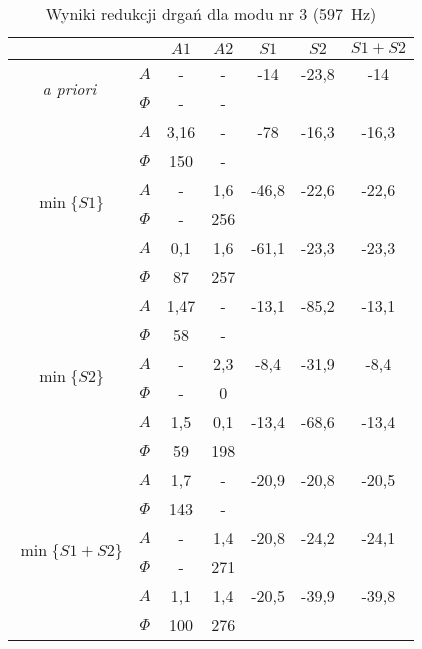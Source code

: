 \documentclass[polish,a4paper,11pt]{mwart}
\begin{document}
  \begin{table}[!tbh]
    \centering
    \caption{Wyniki redukcji drgań dla modu nr 3 (\SI{597}{\hertz})}
    \label{tab:red3}
    \begin{tabular}{|c|c|c|c|c|c|c|}
      \cline{3-7}
      \multicolumn{2}{c|}{}&$A1$&$A2$&$S1$&$S2$&$S1+S2$\\\hline
      \multirow{2}{*}{\textit{a priori}} & $A$ & - & - & -14 & -23,8 & -14\\\cline{2-7}
					 & $\Phi$ & - & - & \multicolumn{3}{c}{}\\\hline
      \multirow{6}{*}{$\min\{S1\}$}   &   $A$ & 3,16 & - & -78 & -16,3 & -16,3\\\cline{2-7}
				      &$\Phi$ & 150 & - & \multicolumn{3}{c}{}\\\cline{2-7}
				      &   $A$ & - & 1,6 & -46,8 & -22,6 & -22,6\\\cline{2-7}
				      &$\Phi$ & - & 256 & \multicolumn{3}{c}{}\\\cline{2-7}
				      &   $A$ & 0,1 & 1,6 & -61,1 & -23,3 & -23,3\\\cline{2-7}
				      &$\Phi$ & 87 & 257 & \multicolumn{3}{c}{}\\\hline
      \multirow{6}{*}{$\min\{S2\}$}   &   $A$ & 1,47 & - & -13,1 & -85,2 & -13,1\\\cline{2-7}
				      &$\Phi$ & 58 & - & \multicolumn{3}{c}{}\\\cline{2-7}
				      &   $A$ & - & 2,3 & -8,4 & -31,9 & -8,4\\\cline{2-7}
				      &$\Phi$ & - & 0 & \multicolumn{3}{c}{}\\\cline{2-7}
				      &   $A$ & 1,5 & 0,1 & -13,4 & -68,6 & -13,4\\\cline{2-7}
				      &$\Phi$ & 59 & 198 & \multicolumn{3}{c}{}\\\hline
      \multirow{6}{*}{$\min\{S1+S2\}$}&   $A$ & 1,7 & - & -20,9 & -20,8 & -20,5\\\cline{2-7}
				      &$\Phi$ & 143 & - & \multicolumn{3}{c}{}\\\cline{2-7}
				      &   $A$ & - & 1,4 & -20,8 & -24,2 & -24,1\\\cline{2-7}
				      &$\Phi$ & - & 271 & \multicolumn{3}{c}{}\\\cline{2-7}
				      &   $A$ & 1,1 & 1,4 & -20,5 & -39,9 & -39,8\\\cline{2-7}
				      &$\Phi$ & 100 & 276 & \multicolumn{3}{c}{}\\\cline{1-4}
    \end{tabular}
  \end{table}
\end{document}
